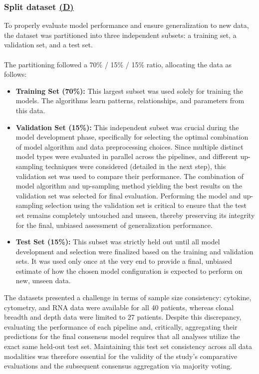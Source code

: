 \documentclass[12pt,a4paper]{report}
\begin{document}
\subsubsection*{Split dataset \hyperref[fig:pipeline-1]{(D)}}
To properly evaluate model performance and ensure generalization to new data, the dataset was partitioned into three independent subsets: a training set, a validation set, and a test set.\\
\\
The partitioning followed a 70\% / 15\% / 15\% ratio, allocating the data as follows:
\begin{itemize}
    \item \textbf{Training Set (70\%):} This largest subset was used solely for training the models. The algorithms learn patterns, relationships, and parameters from this data.
    \item \textbf{Validation Set (15\%):} This independent subset was crucial during the model development phase, specifically for selecting the optimal combination of model algorithm and data preprocessing choices. Since multiple distinct model types were evaluated in parallel across the pipelines, and different up-sampling techniques were considered (detailed in the next step), this validation set was used to compare their performance. The combination of model algorithm and up-sampling method yielding the best results on the validation set was selected for final evaluation. Performing the model and up-sampling selection using the validation set is critical to ensure that the test set remains completely untouched and unseen, thereby preserving its integrity for the final, unbiased assessment of generalization performance.
    \item \textbf{Test Set (15\%):} This subset was strictly held out until all model development and selection were finalized based on the training and validation sets. It was used only once at the very end to provide a final, unbiased estimate of how the chosen model configuration is expected to perform on new, unseen data.
\end{itemize}
\noindent
The datasets presented a challenge in terms of sample size consistency: cytokine, cytometry, and RNA data were available for all 40 patients, whereas clonal breadth and depth data were limited to 27 patients. Despite this discrepancy, evaluating the performance of each pipeline and, critically, aggregating their predictions for the final consensus model requires that all analyses utilize the exact same held-out test set. Maintaining this test set consistency across all data modalities was therefore essential for the validity of the study's comparative evaluations and the subsequent consensus aggregation via majority voting.
\end{document}
